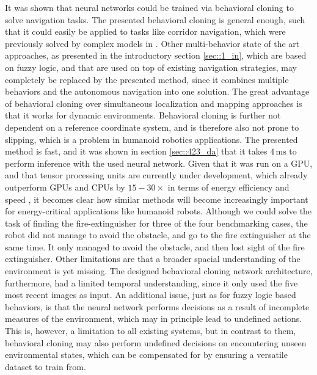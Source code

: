 It was shown that neural networks could be trained via behavioral cloning to solve navigation tasks. The presented behavioral cloning is general enough, such that it could easily be applied to tasks like corridor navigation, which were previously solved by complex models in \cite{faragasso2013vision}. Other multi-behavior state of the art approaches, as presented in the introductory section \ref{sec::1_in}, which are based on fuzzy logic, and that are used on top of existing navigation strategies, may completely be replaced by the presented method, since it combines multiple behaviors and the autonomous navigation into one solution. The great advantage of behavioral cloning over simultaneous localization and mapping approaches is that it works for dynamic environments. Behavioral cloning is further not dependent on a reference coordinate system, and is therefore also not prone to slipping, which is a problem in humanoid robotics applications. The presented method is fast, and it was shown in section \ref{sec::423_da} that it takes $4\,\text{ms}$ to perform inference with the used neural network. Given that it was run on a GPU, and that tensor processing units are currently under development, which already outperform GPUs and CPUs by $15-30\times$ in terms of energy efficiency and speed \cite{jouppi2017datacenter}, it becomes clear how similar methods will become increasingly important for energy-critical applications like humanoid robots. Although we could solve the task of finding the fire-extinguisher for three of the four benchmarking cases, the robot did not manage to avoid the obstacle, and go to the fire extinguisher at the same time. It only managed to avoid the obstacle, and then lost sight of the fire extinguisher. Other limitations are that a broader spacial understanding of the environment is yet missing. The designed behavioral cloning network architecture, furthermore, had a limited temporal understanding, since it only used the five most recent images as input. An additional issue, just as for fuzzy logic based behaviors, is that the neural network performs decisions as a result of incomplete measures of the environment, which may in principle lead to undefined actions. This is, however, a limitation to all existing systems, but in contrast to them, behavioral cloning may also perform undefined decisions on encountering unseen environmental states, which can be compensated for by ensuring a versatile dataset to train from.\\\\
